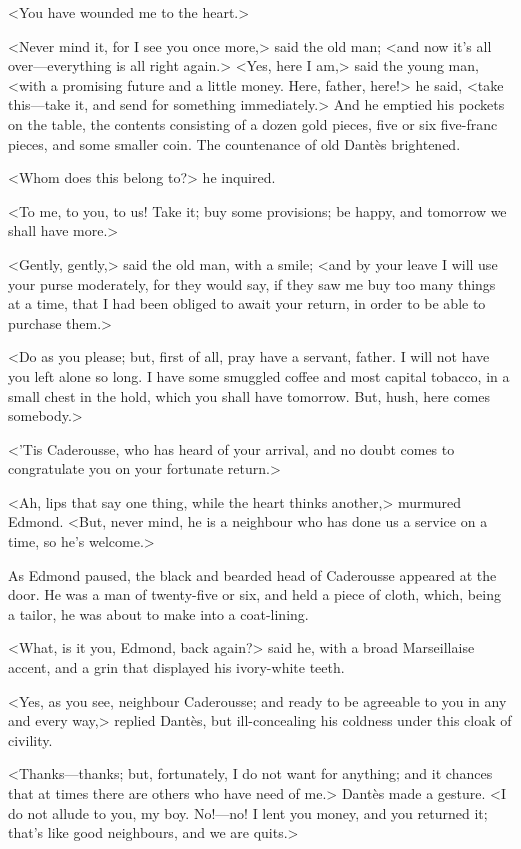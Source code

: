  <You have wounded me to the heart.> 

 <Never mind it, for I see you once more,> said the old man; <and now it's all over—everything is all right again.>  <Yes, here I am,> said the young man, <with a promising future and a little money. Here, father, here!> he said, <take this—take it, and send for something immediately.> And he emptied his pockets on the table, the contents consisting of a dozen gold pieces, five or six five-franc pieces, and some smaller coin. The countenance of old Dantès brightened. 

 <Whom does this belong to?> he inquired. 

 <To me, to you, to us! Take it; buy some provisions; be happy, and tomorrow we shall have more.> 

 <Gently, gently,> said the old man, with a smile; <and by your leave I will use your purse moderately, for they would say, if they saw me buy too many things at a time, that I had been obliged to await your return, in order to be able to purchase them.> 

 <Do as you please; but, first of all, pray have a servant, father. I will not have you left alone so long. I have some smuggled coffee and most capital tobacco, in a small chest in the hold, which you shall have tomorrow. But, hush, here comes somebody.> 

 <'Tis Caderousse, who has heard of your arrival, and no doubt comes to congratulate you on your fortunate return.> 

 <Ah, lips that say one thing, while the heart thinks another,> murmured Edmond. <But, never mind, he is a neighbour who has done us a service on a time, so he's welcome.> 

 As Edmond paused, the black and bearded head of Caderousse appeared at the door. He was a man of twenty-five or six, and held a piece of cloth, which, being a tailor, he was about to make into a coat-lining. 

 <What, is it you, Edmond, back again?> said he, with a broad Marseillaise accent, and a grin that displayed his ivory-white teeth. 

 <Yes, as you see, neighbour Caderousse; and ready to be agreeable to you in any and every way,> replied Dantès, but ill-concealing his coldness under this cloak of civility. 

 <Thanks—thanks; but, fortunately, I do not want for anything; and it chances that at times there are others who have need of me.> Dantès made a gesture. <I do not allude to you, my boy. No!—no! I lent you money, and you returned it; that's like good neighbours, and we are quits.> 

